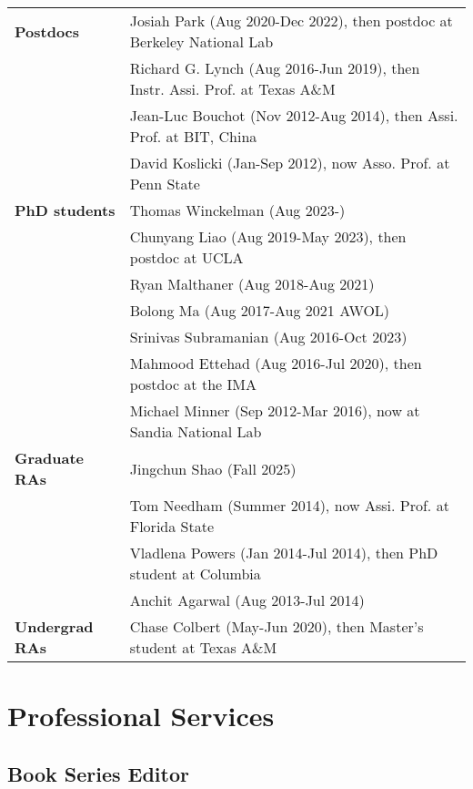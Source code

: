 \documentclass[11pt]{article}
\begin{document}
\begin{tabular}{ll}
{\bf Postdocs \phantom{PhDS}} 
& Josiah Park (Aug 2020-Dec 2022), then postdoc at Berkeley National Lab\\
& Richard  G.  Lynch (Aug 2016-Jun 2019), then Instr. Assi. Prof. at Texas A\&M\\
& Jean-Luc Bouchot (Nov 2012-Aug 2014),
then Assi. Prof. at BIT, China\\
& David Koslicki (Jan-Sep 2012), now 
Asso. Prof. at Penn State\\

{\bf PhD students}  
& Thomas Winckelman (Aug 2023-)\\
& Chunyang Liao (Aug 2019-May 2023), then postdoc at UCLA\\
& Ryan Malthaner (Aug 2018-Aug 2021)\\
& Bolong Ma (Aug 2017-Aug 2021 AWOL)\\
& Srinivas Subramanian (Aug 2016-Oct 2023) \\
& Mahmood Ettehad (Aug 2016-Jul 2020), then postdoc at the IMA\\
& Michael Minner (Sep 2012-Mar 2016), now at Sandia National Lab\\
{\bf Graduate RAs} & Jingchun Shao (Fall 2025)\\
& Tom Needham (Summer 2014), now Assi. Prof. at Florida State\\
& Vladlena Powers (Jan 2014-Jul 2014), then PhD student at Columbia\\
& Anchit Agarwal (Aug 2013-Jul 2014)\\
{\bf Undergrad RAs} & Chase Colbert (May-Jun 2020), then Master's student at Texas A\&M
\end{tabular}


\section{Professional Services}

\subsection{Book Series Editor}
\end{document}

